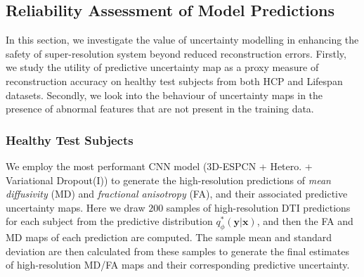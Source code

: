 \subsection{Reliability Assessment of Model Predictions}
In this section, we investigate the value of uncertainty modelling in enhancing the safety of super-resolution system beyond reduced reconstruction errors. Firstly, we study the utility of predictive uncertainty map as a proxy measure of reconstruction accuracy on healthy test subjects from both HCP and Lifespan datasets. Secondly, we look into the behaviour of uncertainty maps in the presence of abnormal features that are not present in the training data. 



\subsubsection*{Healthy Test Subjects} \label{sec:uncertainty_HCP}
We employ the most performant CNN model (3D-ESPCN + Hetero. + Variational Dropout(I)) to generate the high-resolution predictions of \textit{mean diffusivity} (MD) and \textit{fractional anisotropy} (FA), and their associated predictive uncertainty maps.  Here we draw $200$ samples of high-resolution DTI predictions for each subject from the predictive distribution $q_\phi^*(\mathbf{y}|\mathbf{x})$, and then the FA and MD maps of each prediction are computed. The sample mean and standard deviation are then calculated from these samples to generate the final estimates of high-resolution MD/FA maps and their corresponding predictive uncertainty. 

